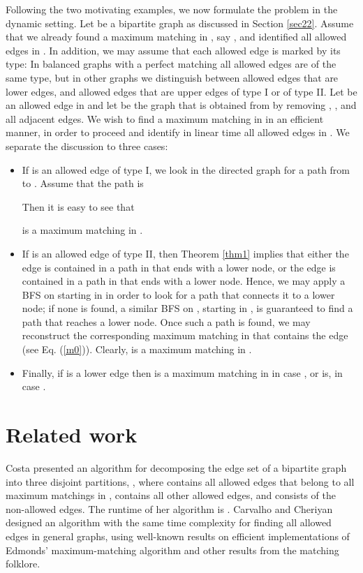 \documentclass[times, 11pt]{article}
\begin{document}
\smallskip
Following the two motivating examples, we now formulate the problem in the dynamic setting.
Let  be a bipartite graph as discussed in Section \ref{sec22}. Assume that we already found
a maximum matching in , say , and identified all allowed edges in .
In addition, we may assume
that each allowed edge
is marked by its type: In balanced graphs with a perfect matching all allowed edges are of the same type, but in other graphs we distinguish between allowed edges
that are lower edges, and allowed edges that are upper edges of type I or of type II.
Let  be an allowed edge in  and let  be the graph that is obtained from  by removing , , and all adjacent edges.
We wish to find a maximum matching in  in an efficient manner, in order to proceed and identify in linear time all allowed edges in .
We separate the discussion to three cases:
\begin{itemize}
\item If  is an allowed edge of type I, we look in
the directed graph  for a path from  to . Assume that the path is

Then it is easy to see that

is a maximum matching in .
\item If  is an allowed edge of type II, then Theorem \ref{thm1} implies that
either the edge  is contained in a path in  that ends with a lower node,
or the edge  is contained in a path in  that ends with a lower node.
Hence, we may apply a BFS on  starting in  in order to look for a path that connects it to a lower node;
if none is found, a similar BFS on , starting in , is guaranteed to find a path that reaches a lower node.
Once such a path is found, we may reconstruct the corresponding maximum matching  in  that contains the edge  (see Eq. (\ref{m0})).
Clearly, 
is a maximum matching in .
\item Finally, if  is a lower edge then  is a maximum matching in  in case , or
 is, in case .
\end{itemize}



\section{Related work}\label{related}
Costa \cite{C94} presented an algorithm for decomposing the edge set of a bipartite graph  into three disjoint partitions, , where
 contains all allowed edges that belong to all maximum matchings in ,  contains all other allowed edges, and  consists of the non-allowed edges.
The runtime of
her algorithm is .
Carvalho and Cheriyan \cite{CC05} designed an algorithm with the same time complexity for finding all allowed edges in
general graphs, using well-known results on efficient
implementations of Edmonds' maximum-matching algorithm and other results from the matching folklore.
\end{document}
